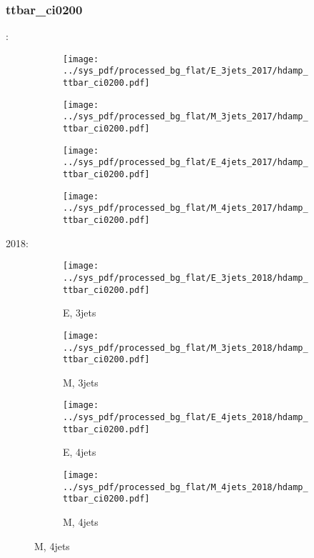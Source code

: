 \documentclass{beamer}
\begin{document}
\begin{frame}
\frametitle{ttbar_ci0200}
\fontsize{5}{1}:
\begin{figure}
\centering
\begin{subfigure}[b]{0.24\textwidth}
\texttt{[image: ../sys\_pdf/processed\_bg\_flat/E\_3jets\_2017/hdamp\_ttbar\_ci0200.pdf]}
\end{subfigure}
\begin{subfigure}[b]{0.24\textwidth}
\texttt{[image: ../sys\_pdf/processed\_bg\_flat/M\_3jets\_2017/hdamp\_ttbar\_ci0200.pdf]}
\end{subfigure}
\begin{subfigure}[b]{0.24\textwidth}
\texttt{[image: ../sys\_pdf/processed\_bg\_flat/E\_4jets\_2017/hdamp\_ttbar\_ci0200.pdf]}
\end{subfigure}
\begin{subfigure}[b]{0.24\textwidth}
\texttt{[image: ../sys\_pdf/processed\_bg\_flat/M\_4jets\_2017/hdamp\_ttbar\_ci0200.pdf]}
\end{subfigure}
\end{figure}
2018:
\begin{figure}
\centering
\begin{subfigure}[b]{0.24\textwidth}
\texttt{[image: ../sys\_pdf/processed\_bg\_flat/E\_3jets\_2018/hdamp\_ttbar\_ci0200.pdf]}
\captionsetup{font=tiny}
\caption{E, 3jets}
\end{subfigure}
\begin{subfigure}[b]{0.24\textwidth}
\texttt{[image: ../sys\_pdf/processed\_bg\_flat/M\_3jets\_2018/hdamp\_ttbar\_ci0200.pdf]}
\captionsetup{font=tiny}
\caption{M, 3jets}
\end{subfigure}
\begin{subfigure}[b]{0.24\textwidth}
\texttt{[image: ../sys\_pdf/processed\_bg\_flat/E\_4jets\_2018/hdamp\_ttbar\_ci0200.pdf]}
\captionsetup{font=tiny}
\caption{E, 4jets}
\end{subfigure}
\begin{subfigure}[b]{0.24\textwidth}
\texttt{[image: ../sys\_pdf/processed\_bg\_flat/M\_4jets\_2018/hdamp\_ttbar\_ci0200.pdf]}
\captionsetup{font=tiny}
\caption{M, 4jets}
\end{subfigure}
\end{figure}
\end{frame}
\end{document}
